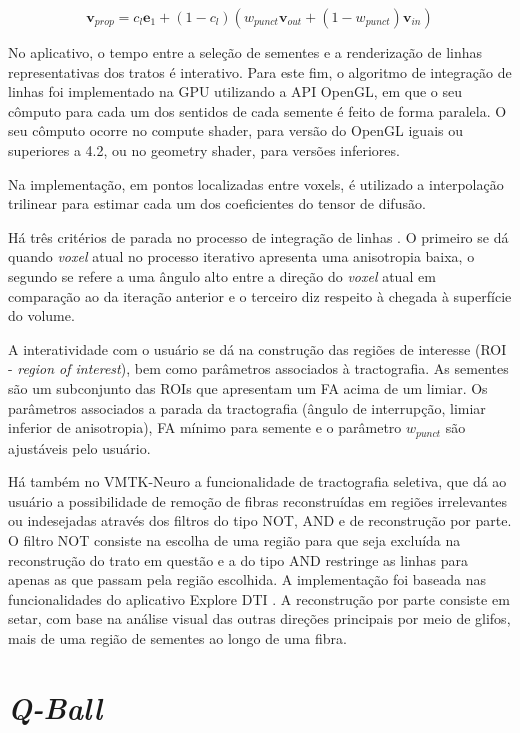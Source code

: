 \documentclass[
    12pt,                %
    oneside,            %
    a4paper,            %
    english,            %
    french,                %
    spanish,            %
    brazil                %
    ]{abntex2}
\begin{document}
\begin{equation}
\label{eq::tractografia_weinstein}
    \textbf{v}_{prop} = c_l\mathbf{e}_1 + (1 - c_l)(w_{punct}\mathbf{v}_{out} + (1-w_{punct})\mathbf{v}_{in})
\end{equation}


No aplicativo, o tempo entre a seleção de sementes e a renderização de linhas representativas dos tratos é interativo. Para este fim, o algoritmo de integração de linhas foi implementado na GPU utilizando a API OpenGL, em que o seu cômputo para cada um dos sentidos de cada semente é feito de forma paralela. O seu cômputo ocorre no compute shader, para versão do OpenGL iguais ou superiores a 4.2, ou no geometry shader, para versões inferiores.

Na implementação, em pontos localizadas entre voxels, é utilizado a interpolação trilinear para estimar cada um dos coeficientes do tensor de difusão.

Há três critérios de parada no processo de integração de linhas \cite{basser2000}. O primeiro se dá quando \textit{voxel} atual no processo iterativo apresenta uma anisotropia baixa, o segundo se refere a uma ângulo alto entre a direção do \textit{voxel} atual em comparação ao da iteração anterior e o terceiro diz respeito à chegada à superfície do volume.

A interatividade com o usuário se dá na construção das regiões de interesse (ROI - \textit{region of interest}), bem como parâmetros associados à tractografia. As sementes são um subconjunto das ROIs que apresentam um FA acima de um limiar. Os parâmetros associados a parada da tractografia (ângulo de interrupção, limiar inferior de anisotropia), FA mínimo para semente e o parâmetro $w_{punct}$ são ajustáveis pelo usuário.


Há também no VMTK-Neuro a funcionalidade de tractografia seletiva, que dá ao usuário a possibilidade de remoção de fibras reconstruídas em regiões irrelevantes ou indesejadas através dos filtros do tipo NOT, AND e de reconstrução por parte. O filtro NOT consiste na escolha de uma região para que seja excluída na reconstrução do trato em questão e a do tipo AND restringe as linhas para apenas as que passam pela região escolhida. A implementação foi  baseada nas funcionalidades do aplicativo Explore DTI \cite{exploredti2009}. A reconstrução por parte consiste em setar, com base na análise visual das outras direções principais por meio de glifos, mais de uma região de sementes ao longo de uma fibra.

\section{\textit{Q-Ball}}
\end{document}
